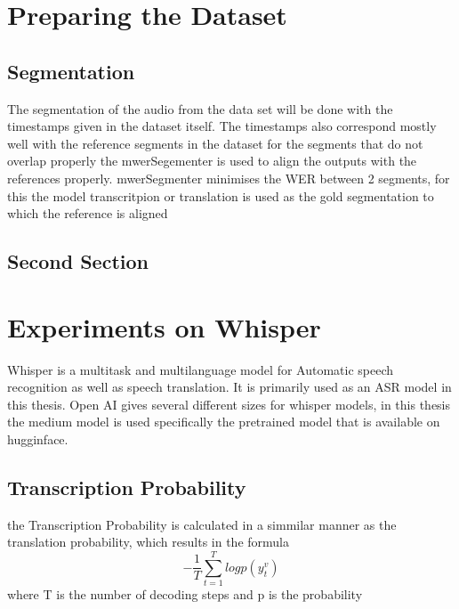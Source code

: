 
\chapter{Preparing the Dataset}
\label{ch:FirstContent}

\section{Segmentation}
\label{sec:FirstContent:FirstSection}
The segmentation of the audio from the data set will be done with the timestamps given in the dataset itself. The timestamps also correspond mostly well with the reference segments in the dataset 
for the segments that do not overlap properly the mwerSegementer is used to align the outputs with the references properly. 
mwerSegmenter minimises the WER between 2 segments,  for this the model transcritpion or translation is used as the gold segmentation to which the reference is aligned 

\section{Second Section}
\label{sec:SecondContent:SecondSection}

\chapter{Experiments on Whisper}
Whisper \cite{radford2022robust} is a multitask and multilanguage model for Automatic speech recognition as well as speech translation. It is primarily used as an ASR model in this thesis. Open AI gives several different sizes for whisper models, in this thesis the medium model is used specifically the pretrained model that is available on hugginface. 

\section{Transcription Probability}
the Transcription Probability is calculated in a simmilar manner as the translation probability, which results in the formula $$-\frac{1}{T}\sum_{t=1}^T log p(y_t^v)$$ where T is the number of decoding steps and p is the probability 

